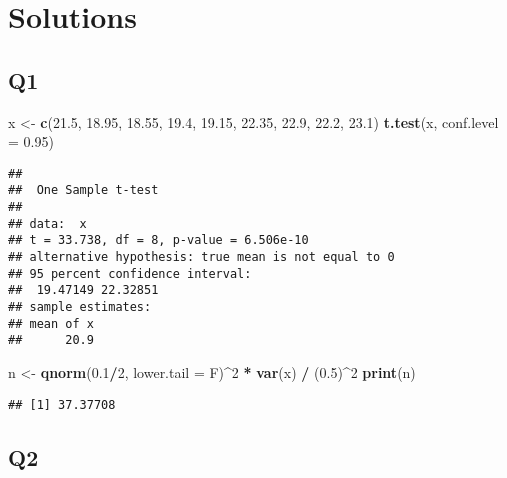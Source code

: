\documentclass[
]{book}
\newenvironment{Shaded}{\begin{snugshade}}{\end{snugshade}}
\newcommand{\DataTypeTok}[1]{\textcolor[rgb]{0.13,0.29,0.53}{#1}}
\newcommand{\DecValTok}[1]{\textcolor[rgb]{0.00,0.00,0.81}{#1}}
\newcommand{\FloatTok}[1]{\textcolor[rgb]{0.00,0.00,0.81}{#1}}
\newcommand{\KeywordTok}[1]{\textcolor[rgb]{0.13,0.29,0.53}{\textbf{#1}}}
\newcommand{\NormalTok}[1]{#1}
\newcommand{\OperatorTok}[1]{\textcolor[rgb]{0.81,0.36,0.00}{\textbf{#1}}}
\newcommand{\StringTok}[1]{\textcolor[rgb]{0.31,0.60,0.02}{#1}}
\theoremstyle{definition}
\theoremstyle{definition}
\theoremstyle{definition}
\theoremstyle{remark}
\begin{document}
\hypertarget{solutions}{%
\section{Solutions}\label{solutions}}

\hypertarget{q1-3}{%
\subsection{Q1}\label{q1-3}}

\begin{Shaded}
\begin{Highlighting}[]
\NormalTok{x <-}\StringTok{ }\KeywordTok{c}\NormalTok{(}\FloatTok{21.5}\NormalTok{, }\FloatTok{18.95}\NormalTok{, }\FloatTok{18.55}\NormalTok{, }\FloatTok{19.4}\NormalTok{, }\FloatTok{19.15}\NormalTok{, }\FloatTok{22.35}\NormalTok{, }\FloatTok{22.9}\NormalTok{, }\FloatTok{22.2}\NormalTok{, }\FloatTok{23.1}\NormalTok{)}
\KeywordTok{t.test}\NormalTok{(x, }\DataTypeTok{conf.level =} \FloatTok{0.95}\NormalTok{)}
\end{Highlighting}
\end{Shaded}

\begin{verbatim}
## 
##  One Sample t-test
## 
## data:  x
## t = 33.738, df = 8, p-value = 6.506e-10
## alternative hypothesis: true mean is not equal to 0
## 95 percent confidence interval:
##  19.47149 22.32851
## sample estimates:
## mean of x 
##      20.9
\end{verbatim}

\begin{Shaded}
\begin{Highlighting}[]
\NormalTok{n <-}\StringTok{ }\KeywordTok{qnorm}\NormalTok{(}\FloatTok{0.1}\OperatorTok{/}\DecValTok{2}\NormalTok{, }\DataTypeTok{lower.tail =}\NormalTok{ F)}\OperatorTok{^}\DecValTok{2} \OperatorTok{*}\StringTok{ }\KeywordTok{var}\NormalTok{(x) }\OperatorTok{/}\StringTok{ }\NormalTok{(}\FloatTok{0.5}\NormalTok{)}\OperatorTok{^}\DecValTok{2}
\KeywordTok{print}\NormalTok{(n)}
\end{Highlighting}
\end{Shaded}

\begin{verbatim}
## [1] 37.37708
\end{verbatim}

\hypertarget{q2-3}{%
\subsection{Q2}\label{q2-3}}
\end{document}
